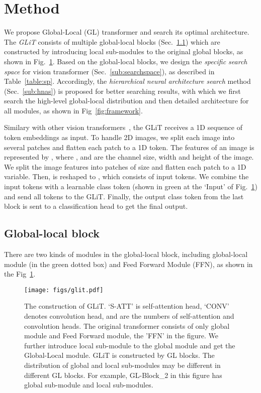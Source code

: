 \documentclass[10pt,twocolumn,letterpaper]{article}
\begin{document}
\section{Method}
We propose Global-Local (GL) transformer and search its optimal architecture. The \textit{GLiT} consists of multiple global-local blocks (Sec.~\ref{sub:lg-block}) which are constructed by introducing local sub-modules to the original global blocks, as shown in Fig.~\ref{fig:lg}. Based on the global-local blocks, we design the \textit{specific search space} for vision transformer (Sec.~\ref{sub:searchspace}), as described in Table~\ref{table:sp}. Accordingly, the \textit{hierarchical neural architecture search} method (Sec.~\ref{sub:hnas}) is proposed for better searching results, with which we first search the high-level global-local distribution and then detailed architecture for all modules, as shown in Fig~\ref{fig:framework}.

Similary with other vision transformers~\cite{vit_trans,deit}, the GLiT receives a 1D sequence of token embeddings as input.
To handle 2D images, we split each image into several patches and flatten each patch to a 1D token. 
The features of an image is represented by , where ,  and  are the channel size, width and height of the image.
We split the image features  into patches of size  and flatten each patch to a 1D variable. Then,  is reshaped to , which consists of  input tokens. We combine the  input tokens with a learnable class token (shown in green at the `Input' of Fig.~\ref{fig:lg}) and send all  tokens to the GLiT.
Finally, the output class token from the last block is sent to a classification head to get the final output.



\subsection{Global-local block}
\label{sub:lg-block}


There are two kinds of modules in the global-local block, including global-local module (in the green dotted box) and Feed Forward Module (FFN), as shown in the Fig~\ref{fig:lg}.

\begin{figure}[t]
	\centering
	\texttt{[image: figs/glit.pdf]}\\
	\caption{The construction of GLiT. `S-ATT' is self-attention head, `CONV' denotes convolution head,  and  are the numbers of self-attention and convolution heads. The original transformer consists of only global module and Feed Forward module, \ie the 'FFN' in the figure. 
	We further introduce local sub-module to the global module and get the Global-Local module. 
GLiT is constructed by  GL blocks. The distribution of global and local sub-modules may be different in different GL blocks. For example, GL-Block\_2 in this figure has  global sub-module and  local sub-modules.}
	\label{fig:lg}
	 \vspace{-10pt}
\end{figure}
\end{document}

